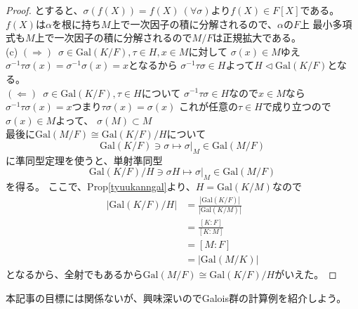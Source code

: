 \documentclass[dvipdfmx]{jsarticle}
\theoremstyle{definition}
\begin{document}
\begin{proof}
とすると、$\sigma(f(X))=f(X)\>(\forall \sigma)$より$f(X)\in F[X]$である。
$f(X)$は$\alpha$を根に持ち$M$上で一次因子の積に分解されるので、$\alpha$の$F$上
最小多項式も$M$上で一次因子の積に分解されるので$M/F$は正規拡大である。\\
(c)
$(\Rightarrow)\;\>$$\sigma\in\mathrm{Gal}(K/F),\tau\in H,x\in M$に対して
$\sigma(x)\in M$ゆえ$\sigma ^{-1}\tau\sigma (x)=\sigma ^{-1}\sigma (x)=x$となるから
$\sigma ^{-1}\tau\sigma\in H$よって$H\vartriangleleft\mathrm{Gal}(K/F)$となる。\\
$(\Leftarrow)\;\>$$\sigma\in\mathrm{Gal}(K/F),\tau\in H$について
$\sigma ^{-1}\tau\sigma\in H$なので$x\in M$なら
$\sigma ^{-1}\tau\sigma(x)=x$つまり$\tau\sigma(x)=\sigma(x)$
これが任意の$\tau\in H$で成り立つので$\sigma(x)\in M$よって、
$\sigma(M)\subset M$\\
最後に$\mathrm{Gal}(M/F)\cong \mathrm{Gal}(K/F)/H$について\\
\[
\mathrm{Gal}(K/F)\ni \sigma\mapsto \sigma|_{M}\in \mathrm{Gal}(M/F)
\]
に準同型定理を使うと、単射準同型
\[
\mathrm{Gal}(K/F)/H\ni \sigma H\mapsto \sigma|_{M}\in \mathrm{Gal}(M/F)
\]を得る。
ここで、Prop\ref{tyuukanngal}より、$H=\mathrm{Gal}(K/M)$なので
\begin{align*}
  \left|\mathrm{Gal}(K/F)/H\right|&=\frac{|\mathrm{Gal}(K/F)|}{|\mathrm{Gal}(K/M)|}\\
                                  &=\frac{[K:F]}{[K:M]}\\
                                  &=[M:F]\\
                                  &=|\mathrm{Gal}(M/K)|
\end{align*}
となるから、全射でもあるから$\mathrm{Gal}(M/F)\cong \mathrm{Gal}(K/F)/H$がいえた。
\end{proof}
\newpage
本記事の目標には関係ないが、興味深いのでGalois群の計算例を紹介しよう。
\end{document}

